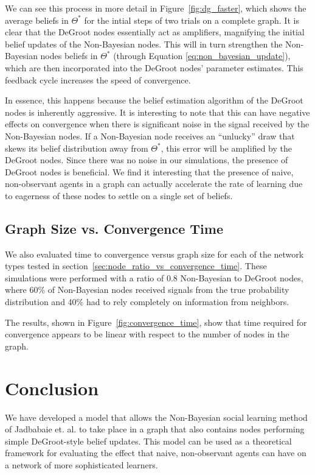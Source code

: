 \documentclass[letterpaper, 11pt, conference]{ieeeconf}
\begin{document}
We can see this process in more detail in Figure~\ref{fig:dg_faster}, which shows the average beliefs in $\Theta^*$ for the intial steps of two trials on a complete graph. It is clear that the DeGroot nodes essentially act as amplifiers, magnifying the initial belief updates of the Non-Bayesian nodes. This will in turn strengthen the Non-Bayesian nodes beliefs in $\Theta^*$ (through Equation \ref{eq:non_bayesian_update}), which are then incorporated into the DeGroot nodes' parameter estimates. This feedback cycle increases the speed of convergence.

In essence, this happens because the belief estimation algorithm of the DeGroot nodes is inherently aggressive. It is interesting to note that this can have negative effects on convergence when there is significant noise in the signal received by the Non-Bayesian nodes. If a Non-Bayesian node receives an ``unlucky'' draw that skews its belief distribution away from $\Theta^*$, this error will be amplified by the DeGroot nodes. Since there was no noise in our simulations, the presence of DeGroot nodes is beneficial. We find it interesting that the presence of naive, non-observant agents in a graph can actually accelerate the rate of learning due to eagerness of these nodes to settle on a single set of beliefs.


\subsection{Graph Size vs. Convergence Time}

We also evaluated time to convergence versus graph size for each of the network types tested in section~\ref{sec:node_ratio_vs_convergence_time}.  These simulations were performed with a ratio of 0.8 Non-Bayesian to DeGroot nodes, where 60\% of Non-Bayesian nodes received signals from the true probability distribution and 40\% had to rely completely on information from neighbors.

The results, shown in Figure~\ref{fig:convergence_time}, show that time required for convergence appears to be linear with respect to the number of nodes in the graph.

\section{Conclusion}

We have developed a model that allows the Non-Bayesian social learning method of Jadbabaie et. al. to take place in a graph that also contains nodes performing simple DeGroot-style belief updates.  This model can be used as a theoretical framework for evaluating the effect that naive, non-observant agents can have on a network of more sophisticated learners.
\end{document}
